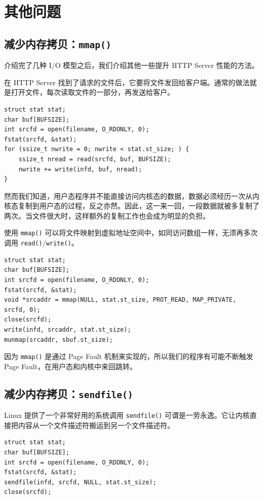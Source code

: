 \documentclass[a4paper]{article}
\begin{document}
\section{其他问题}

\subsection{减少内存拷贝：\texttt{mmap()}}

介绍完了几种 I/O 模型之后，我们介绍其他一些提升 HTTP Server 性能的方法。

在 HTTP Server 找到了请求的文件后，它要将文件发回给客户端。通常的做法就是打开文件，每次读取文件的一部分，再发送给客户。

\begin{verbatim}
struct stat stat;
char buf[BUFSIZE];
int srcfd = open(filename, O_RDONLY, 0);
fstat(srcfd, &stat);
for (ssize_t nwrite = 0; nwrite < stat.st_size; ) {
    ssize_t nread = read(srcfd, buf, BUFSIZE);
    nwrite += write(infd, buf, nread);
}
\end{verbatim}

然而我们知道，用户态程序并不能直接访问内核态的数据，数据必须经历一次从内核态复制到用户态的过程，反之亦然。因此，这一来一回，一段数据就被多复制了两次。当文件很大时，这样额外的复制工作也会成为明显的负担。

使用 \texttt{mmap()} 可以将文件映射到虚拟地址空间中，如同访问数组一样，无须再多次调用 \texttt{read()}/\texttt{write()}。

\begin{verbatim}
struct stat stat;
char buf[BUFSIZE];
int srcfd = open(filename, O_RDONLY, 0);
fstat(srcfd, &stat);
void *srcaddr = mmap(NULL, stat.st_size, PROT_READ, MAP_PRIVATE, srcfd, 0);
close(srcfd);
write(infd, srcaddr, stat.st_size);
munmap(srcaddr, sbuf.st_size);
\end{verbatim}

因为 \texttt{mmap()} 是通过 Page Fault 机制来实现的，所以我们的程序有可能不断触发 Page Fault，在用户态和内核中来回跳转。

\subsection{减少内存拷贝：\texttt{sendfile()}}

Linux 提供了一个非常好用的系统调用 \texttt{sendfile()} 可谓是一劳永逸。它让内核直接把内容从一个文件描述符搬运到另一个文件描述符。

\begin{verbatim}
struct stat stat;
char buf[BUFSIZE];
int srcfd = open(filename, O_RDONLY, 0);
fstat(srcfd, &stat);
sendfile(infd, srcfd, NULL, stat.st_size);
close(srcfd);
\end{verbatim}
\end{document}
